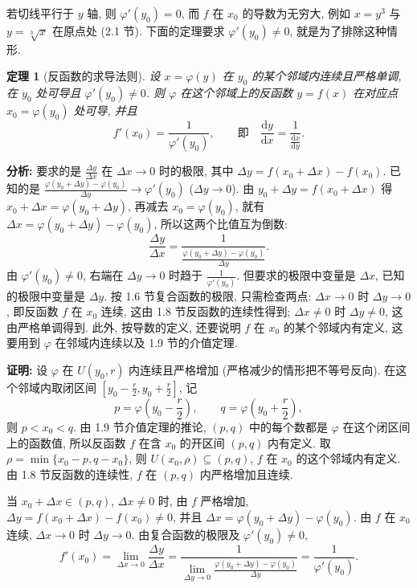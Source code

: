 \documentclass[UTF8,openany]{ctexbook}
\theoremstyle{chinesetextbook}
\newtheorem{theorem}{定理}[section]
\newenvironment{cnproof}{\par\indent\textbf{证明:} \ignorespaces}{\par}
\newcommand{\dd}{\mathrm d}
\begin{document}
若切线平行于 $y$ 轴, 则 $\varphi'(y_0)=0$, 而 $f$ 在 $x_0$ 的导数为无穷大, 例如 $x=y^3$ 与 $y=\sqrt[3]x$ 在原点处 (2.1 节). 下面的定理要求 $\varphi'(y_0)\ne0$, 就是为了排除这种情形.
\begin{theorem}[反函数的求导法则]\label{thm:c2-2-inv}
设 $x=\varphi(y)$ 在 $y_0$ 的某个邻域内连续且严格单调, 在 $y_0$ 处可导且 $\varphi'(y_0)\ne0$. 则 $\varphi$ 在这个邻域上的反函数 $y=f(x)$ 在对应点 $x_0=\varphi(y_0)$ 处可导, 并且
\[
f'(x_0)=\frac1{\varphi'(y_0)},\qquad\text{即}\quad\frac{\dd y}{\dd x}=\frac1{\displaystyle\frac{\dd x}{\dd y}}.
\]
\end{theorem}
\par\indent\textbf{分析:} 要求的是 $\displaystyle\frac{\Delta y}{\Delta x}$ 在 $\Delta x\to0$ 时的极限, 其中 $\Delta y=f(x_0+\Delta x)-f(x_0)$. 已知的是 $\displaystyle\frac{\varphi(y_0+\Delta y)-\varphi(y_0)}{\Delta y}\to\varphi'(y_0)$ ($\Delta y\to0$). 由 $y_0+\Delta y=f(x_0+\Delta x)$ 得 $x_0+\Delta x=\varphi(y_0+\Delta y)$, 再减去 $x_0=\varphi(y_0)$, 就有 $\Delta x=\varphi(y_0+\Delta y)-\varphi(y_0)$, 所以这两个比值互为倒数:
\[
\frac{\Delta y}{\Delta x}=\frac1{\displaystyle\frac{\varphi(y_0+\Delta y)-\varphi(y_0)}{\Delta y}}.
\]
由 $\varphi'(y_0)\ne0$, 右端在 $\Delta y\to0$ 时趋于 $\displaystyle\frac1{\varphi'(y_0)}$. 但要求的极限中变量是 $\Delta x$, 已知的极限中变量是 $\Delta y$. 按 1.6 节复合函数的极限, 只需检查两点: $\Delta x\to0$ 时 $\Delta y\to0$, 即反函数 $f$ 在 $x_0$ 连续, 这由 1.8 节反函数的连续性得到; $\Delta x\ne0$ 时 $\Delta y\ne0$, 这由严格单调得到. 此外, 按导数的定义, 还要说明 $f$ 在 $x_0$ 的某个邻域内有定义, 这要用到 $\varphi$ 在邻域内连续以及 1.9 节的介值定理.
\begin{cnproof}
设 $\varphi$ 在 $U(y_0,r)$ 内连续且严格增加 (严格减少的情形把不等号反向). 在这个邻域内取闭区间 $\displaystyle\left[y_0-\frac r2,y_0+\frac r2\right]$, 记
\[
p=\varphi\left(y_0-\frac r2\right),\qquad q=\varphi\left(y_0+\frac r2\right),
\]
则 $p<x_0<q$. 由 1.9 节介值定理的推论, $(p,q)$ 中的每个数都是 $\varphi$ 在这个闭区间上的函数值, 所以反函数 $f$ 在含 $x_0$ 的开区间 $(p,q)$ 内有定义. 取 $\rho=\min\{x_0-p,q-x_0\}$, 则 $U(x_0,\rho)\subseteq(p,q)$, $f$ 在 $x_0$ 的这个邻域内有定义. 由 1.8 节反函数的连续性, $f$ 在 $(p,q)$ 内严格增加且连续.

当 $x_0+\Delta x\in(p,q)$, $\Delta x\ne0$ 时, 由 $f$ 严格增加, $\Delta y=f(x_0+\Delta x)-f(x_0)\ne0$, 并且 $\Delta x=\varphi(y_0+\Delta y)-\varphi(y_0)$. 由 $f$ 在 $x_0$ 连续, $\Delta x\to0$ 时 $\Delta y\to0$. 由复合函数的极限及 $\varphi'(y_0)\ne0$,
\[
f'(x_0)=\lim_{\Delta x\to0}\frac{\Delta y}{\Delta x}=\frac1{\displaystyle\lim_{\Delta y\to0}\frac{\varphi(y_0+\Delta y)-\varphi(y_0)}{\Delta y}}=\frac1{\varphi'(y_0)}.
\]
\end{cnproof}
\end{document}
